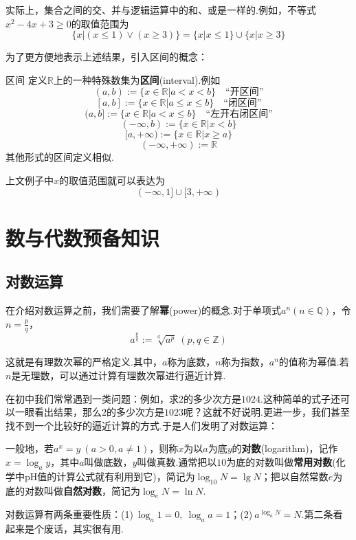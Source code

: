 \documentclass[lang=cn, zihao=5]{elegantbook}
\newcommand{\R}{\mathbb{R}}
\begin{document}
实际上，集合之间的交、并与逻辑运算中的和、或是一样的.例如，不等式$x^2-4x+3 \geq 0$的取值范围为$$\{ x|(x \leq 1) \vee (x \geq 3) \} = \{ x|x \leq 1 \} \cup \{ x|x \geq 3 \}$$

为了更方便地表示上述结果，引入区间的概念：

\begin{definition}{区间}
	定义$\R$上的一种特殊数集为\textbf{区间}(interval).例如 \\
	$$(a,b):=\{ x \in \R | a<x<b \} \quad \textit{“开区间”}$$
	$$[a,b]:=\{ x \in \R | a \leq x \leq b \} \quad \textit{“闭区间”}$$
	$$(a,b]:=\{ x \in \R | a<x \leq b \} \quad \textit{“左开右闭区间”}$$
	$$(-\infty,b):=\{ x \in \R | x<b \}$$
	$$[a,+\infty):=\{ x \in \R | x \geq a \}$$
	$$(-\infty ,+\infty):= \R $$
	其他形式的区间定义相似.
\end{definition}

上文例子中$x$的取值范围就可以表达为$$(-\infty ,1] \cup [3,+\infty )$$


\chapter{数与代数预备知识}

\section{对数运算}

在介绍对数运算之前，我们需要了解\textbf{幂}(power)的概念.对于单项式$a^n(n \in \mathbb{Q})$，令$n=\frac{p}{q}$，
$$a^{\frac{p}{q}}:=\sqrt[q]{a^p} \ (p,q \in \mathbb{Z})$$

这就是有理数次幂的严格定义.其中，$a$称为底数，$n$称为指数，$a^n$的值称为幂值.若$n$是无理数，可以通过计算有理数次幂进行逼近计算.

在初中我们常常遇到一类问题：例如，求$2$的多少次方是$1024$.这种简单的式子还可以一眼看出结果，那么$2$的多少次方是$1023$呢？这就不好说明.更进一步，我们甚至找不到一个比较好的逼近计算的方式.于是人们发明了对数运算：

一般地，若$a^x=y~(a>0,a \neq 1)$，则称$x$为以$a$为底$y$的\textbf{对数}(logarithm)，记作$x = \log_{a}{y}$，其中$a$叫做底数，$y$叫做真数.通常把以$10$为底的对数叫做\textbf{常用对数}(化学中pH值的计算公式就有利用到它)，简记为$\log_{10}{N}=\lg N$；把以自然常数$e$为底的对数叫做\textbf{自然对数}，简记为$\log_{e}{N}=\ln N$.

对数运算有两条重要性质：(1)$~\log_{a}{1} = 0,~\log_{a}{a}=1$；(2)$~a^{\log_{a}{N}}=N$.第二条看起来是个废话，其实很有用.
\end{document}
